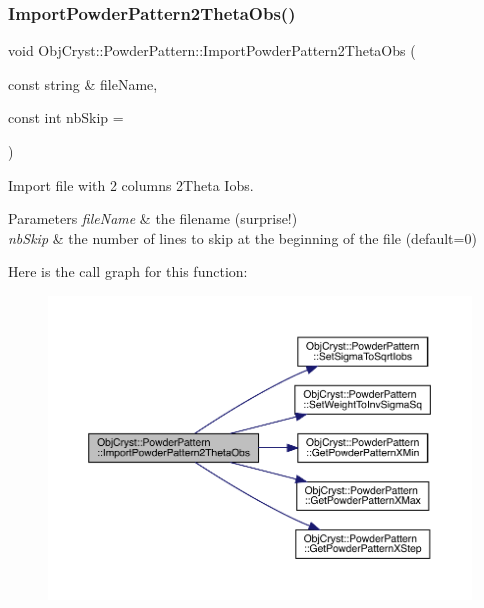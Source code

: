 \subsubsection{\texorpdfstring{ImportPowderPattern2ThetaObs()}{ImportPowderPattern2ThetaObs()}}
{\footnotesize\ttfamily void Obj\+Cryst\+::\+Powder\+Pattern\+::\+Import\+Powder\+Pattern2\+Theta\+Obs (\begin{DoxyParamCaption}\item[{const string \&}]{file\+Name,  }\item[{const int}]{nb\+Skip = {} }\end{DoxyParamCaption})}



Import file with 2 columns 2Theta Iobs. 


\begin{DoxyParams}{Parameters}
{\em file\+Name} & the filename (surprise!) \\
\hline
{\em nb\+Skip} & the number of lines to skip at the beginning of the file (default=0) \\
\hline
\end{DoxyParams}
Here is the call graph for this function\+:
\nopagebreak
\begin{figure}[H]
\begin{center}
\leavevmode
\includegraphics[width=350pt]{class_obj_cryst_1_1_powder_pattern_a1c817b8e20b03b216323933e01e6fb00_cgraph}
\end{center}
\end{figure}
\mbox{\label{class_obj_cryst_1_1_powder_pattern_aee56a2f23b8af5c855ceae82c246f242}} 
